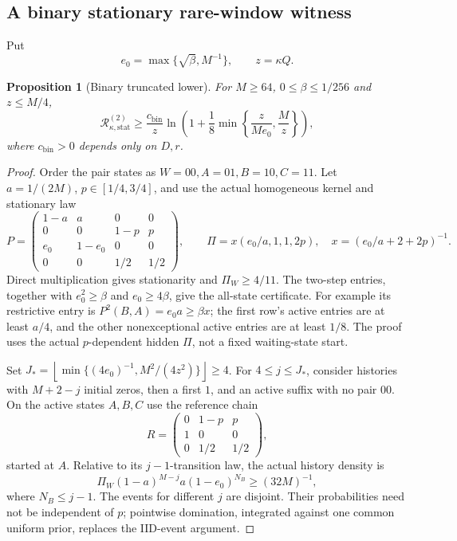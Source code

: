 \documentclass[11pt,letterpaper]{article}
\newtheorem{proposition}[theorem]{Proposition}
\theoremstyle{definition}\newtheorem{definition}[theorem]{Definition}
\theoremstyle{remark}\newtheorem{remark}[theorem]{Remark}
\newcommand{\floor}[1]{\left\lfloor #1\right\rfloor}
\newcommand{\Risk}{\mathcal{R}}
\begin{document}
\subsection{A binary stationary rare-window witness}
Put
\[
 e_0=\max\{\sqrt\beta,M^{-1}\},\qquad z=\kappa Q.
\]
\begin{proposition}[Binary truncated lower]\label{prop:binarylower}
For $M\ge64$, $0\le\beta\le1/256$ and $z\le M/4$,
\begin{equation}\label{eq:binarylower}
 \Risk_{\kappa,\mathrm{stat}}^{(2)}
 \ge\frac{c_{\mathrm{bin}}}{z}
 \ln\left(1+\frac18\min\left\{\frac{z}{Me_0},\frac Mz\right\}\right),
\end{equation}
where $c_{\mathrm{bin}}>0$ depends only on $D,r$.
\end{proposition}
\begin{proof}
Order the pair states as $W=00,A=01,B=10,C=11$. Let $a=1/(2M)$, $p\in[1/4,3/4]$, and use the actual homogeneous kernel and stationary law
\[
 P=\begin{pmatrix}
 1-a&a&0&0\\
 0&0&1-p&p\\
 e_0&1-e_0&0&0\\
 0&0&1/2&1/2
 \end{pmatrix},\qquad
 \Pi=x(e_0/a,1,1,2p),\quad x=(e_0/a+2+2p)^{-1}.
\]
Direct multiplication gives stationarity and $\Pi_W\ge4/11$. The two-step entries, together with $e_0^2\ge\beta$ and $e_0\ge4\beta$, give the all-state certificate. For example its restrictive entry is
$P^2(B,A)=e_0a\ge\beta x$; the first row's active entries are at least $a/4$, and the other nonexceptional active entries are at least $1/8$. The proof uses the actual $p$-dependent hidden $\Pi$, not a fixed waiting-state start.

Set $J_*=\floor{\min\{(4e_0)^{-1},M^2/(4z^2)\}}\ge4$.
For $4\le j\le J_*$, consider histories with $M+2-j$ initial zeros, then a first $1$, and an active suffix with no pair $00$. On the active states $A,B,C$ use the reference chain
\[
 R=\begin{pmatrix}0&1-p&p\\1&0&0\\0&1/2&1/2\end{pmatrix},
\]
started at $A$. Relative to its $j-1$-transition law, the actual history density is
\[
 \Pi_W(1-a)^{M-j}a(1-e_0)^{N_B}\ge(32M)^{-1},
\]
where $N_B\le j-1$. The events for different $j$ are disjoint. Their probabilities need not be independent of $p$; pointwise domination, integrated against one common uniform prior, replaces the IID-event argument.


\end{proof}
\end{document}
